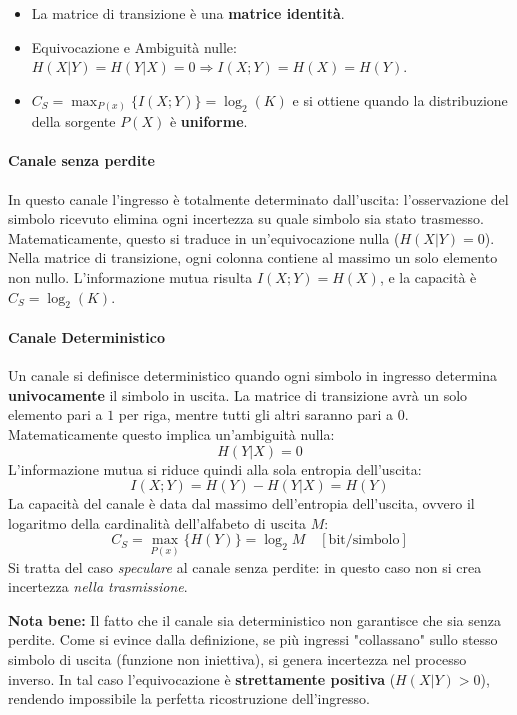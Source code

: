 \begin{itemize}
    \item La matrice di transizione è una \textbf{matrice identità}.
    \item Equivocazione e Ambiguità nulle: $H(X|Y) = H(Y|X) = 0 \Rightarrow I(X;Y) = H(X) = H(Y)$.
    \item $C_S = \max_{P(x)}\{I(X;Y)\} = \log_2(K)$ e si ottiene quando la distribuzione della sorgente $P(X)$ è \textbf{uniforme}.
\end{itemize}

\paragraph{Canale senza perdite}
In questo canale l'ingresso è totalmente determinato dall'uscita: l'osservazione del simbolo ricevuto elimina ogni incertezza su quale simbolo sia stato trasmesso. Matematicamente, questo si traduce in un'equivocazione nulla ($H(X|Y) = 0$). Nella matrice di transizione, ogni colonna contiene al massimo un solo elemento non nullo.
L'informazione mutua risulta $I(X;Y) = H(X)$, e la capacità è $C_S = \log_2(K)$.
%


\paragraph{Canale Deterministico}
Un canale si definisce deterministico quando ogni simbolo in ingresso determina \textbf{univocamente} il simbolo in uscita. La matrice di transizione avrà un solo elemento pari a $1$ per riga, mentre tutti gli altri saranno pari a $0$.
Matematicamente questo implica un'ambiguità nulla:
\[ H(Y|X) = 0 \]
L'informazione mutua si riduce quindi alla sola entropia dell'uscita:
\[ I(X;Y) = H(Y) - H(Y|X) = H(Y) \]
La capacità del canale è data dal massimo dell'entropia dell'uscita, ovvero il logaritmo della cardinalità dell'alfabeto di uscita $M$:
\[ C_S = \max_{P(x)} \{ H(Y) \} = \log_2 M \quad [\text{bit/simbolo}] \]
Si tratta del caso \textit{speculare} al canale senza perdite: in questo caso non si crea incertezza \textit{nella trasmissione}.



\textbf{Nota bene:} Il fatto che il canale sia deterministico non garantisce che sia senza perdite. Come si evince dalla definizione, se più ingressi "collassano" sullo stesso simbolo di uscita (funzione non iniettiva), si genera incertezza nel processo inverso. In tal caso l'equivocazione è \textbf{strettamente positiva} ($H(X|Y) > 0$), rendendo impossibile la perfetta ricostruzione dell'ingresso.



